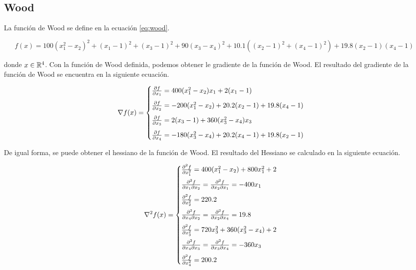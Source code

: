 \subsection*{Wood}

La función de Wood se define en la ecuación \ref{eq:wood}.

\changefontsizes{10pt}
\begin{equation}
    f(x) = 100(x_1^2-x_2)^2+(x_1-1)^2+(x_3-1)^2+90(x_3-x_4)^2 +10.1((x_2-1)^2+(x_4-1)^2)+19.8(x_2-1)(x_4-1) \label{eq:wood}
\end{equation}
\normalsize

donde $x\in \mathbb{R}^4$. Con la función de Wood definida, podemos obtener le gradiente de la función de Wood. El resultado del gradiente de la función de Wood se encuentra en la siguiente ecuación.

\begin{equation}
    \nabla f(x) = \begin{cases}
        \frac{\partial f}{\partial x_1}=400(x_1^2-x_2)x_1 +2(x_1-1)             \\[0.25cm]
        \frac{\partial f}{\partial x_2}=-200(x_1^2-x_2)+20.2(x_2-1)+19.8(x_4-1) \\[0.25cm]
        \frac{\partial f}{\partial x_3}=2(x_3-1)+360(x_3^2-x_4)x_3              \\[0.25cm]
        \frac{\partial f}{\partial x_4}=-180(x_3^2-x_4)+20.2(x_4-1)+19.8(x_2-1)
    \end{cases} \label{eq:wood_gradient}
\end{equation}

De igual forma, se puede obtener el hessiano de la función de Wood. El resultado del Hessiano se calculado en la siguiente ecuación.

\begin{equation}
    \nabla^2 f(x) = \begin{cases}
        \frac{\partial^2 f}{\partial x_1^2} = 400(x_1^2-x_2)+800x_1^2+2             \\[0.25cm]
        \frac{\partial^2 f}{\partial x_1 \partial x_2} =\frac{\partial^2 f}{\partial x_2 \partial x_1} = -400x_1 \\[0.25cm]
        \frac{\partial^2 f}{\partial x_2^2} = 220.2                                 \\[0.25cm]
        \frac{\partial^2 f}{\partial x_4 \partial x_2} = \frac{\partial^2 f}{\partial x_2 \partial x_4} = 19.8   \\[0.25cm]
        \frac{\partial^2 f}{\partial x_3^2} = 720x_3^2+360(x_3^2-x_4)+2             \\[0.25cm]
        \frac{\partial^2 f}{\partial x_4 \partial x_3}=\frac{\partial^2 f}{\partial x_3 \partial x_4} = -360x_3  \\[0.25cm]
        \frac{\partial^2 f}{\partial x_4^2} = 200.2
    \end{cases} \label{eq:wood_hessian}
\end{equation}

